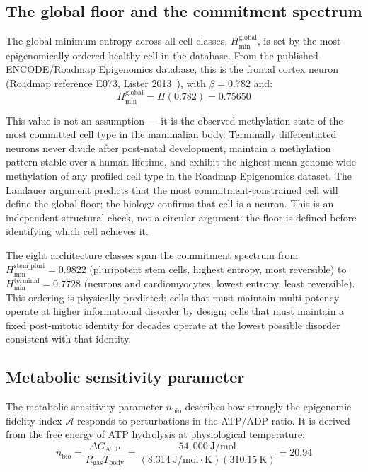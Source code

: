 \documentclass[12pt,a4paper]{article}
\newcommand{\Hmin}{H_{\min}}
\newcommand{\nbio}{n_{\mathrm{bio}}}
\newcommand{\Ascore}{\mathcal{A}}
\newcommand{\Tbody}{T_{\mathrm{body}}}
\newcommand{\Rgas}{R_{\mathrm{gas}}}
\newcommand{\dGATP}{\Delta G_{\mathrm{ATP}}}
\begin{document}
\subsection{The global floor and the commitment spectrum}
\label{sec:global}

The global minimum entropy across all cell classes, $\Hmin^{\mathrm{global}}$,
is set by the most epigenomically ordered healthy cell in the database. From
the published ENCODE/Roadmap Epigenomics database, this is the frontal cortex
neuron (Roadmap reference E073, Lister 2013~\cite{Lister2013}), with
$\beta = 0.782$ and:
\begin{equation}
  \Hmin^{\mathrm{global}} = H(0.782) = 0.75650
  \label{eq:global}
\end{equation}

This value is not an assumption --- it is the observed methylation state of
the most committed cell type in the mammalian body. Terminally differentiated
neurons never divide after post-natal development, maintain a methylation
pattern stable over a human lifetime, and exhibit the highest mean genome-wide
methylation of any profiled cell type in the Roadmap Epigenomics dataset.
The Landauer argument predicts that the most commitment-constrained cell will
define the global floor; the biology confirms that cell is a neuron. This
is an independent structural check, not a circular argument: the floor is
defined before identifying which cell achieves it.

The eight architecture classes span the commitment spectrum from
$\Hmin^{\mathrm{stem\_pluri}} = 0.9822$ (pluripotent stem cells, highest
entropy, most reversible) to $\Hmin^{\mathrm{terminal}} = 0.7728$ (neurons
and cardiomyocytes, lowest entropy, least reversible). This ordering is
physically predicted: cells that must maintain multi-potency operate at
higher informational disorder by design; cells that must maintain a fixed
post-mitotic identity for decades operate at the lowest possible disorder
consistent with that identity.

\subsection{Metabolic sensitivity parameter}
\label{sec:nbio}

The metabolic sensitivity parameter $\nbio$ describes how strongly the
epigenomic fidelity index $\Ascore$ responds to perturbations in the
ATP/ADP ratio. It is derived from the free energy of ATP hydrolysis at
physiological temperature:
\begin{equation}
  \nbio = \frac{\dGATP}{\Rgas \Tbody} = \frac{54{,}000~\mathrm{J/mol}}{(8.314~\mathrm{J/mol{\cdot}K})(310.15~\mathrm{K})} = 20.94
  \label{eq:nbio}
\end{equation}
\end{document}
